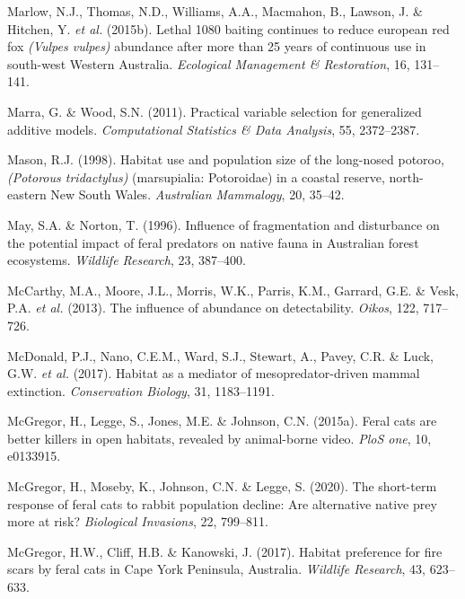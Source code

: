 \documentclass[11pt,a4paper,titlepage,twoside,openright]{style/unimelbthesis}
\begin{document}
\begin{mainmatter}
\leavevmode\hypertarget{ref-marlow2015lethal}{}%
Marlow, N.J., Thomas, N.D., Williams, A.A., Macmahon, B., Lawson, J. \& Hitchen, Y. \emph{et al.} (2015b). Lethal 1080 baiting continues to reduce european red fox \emph{(Vulpes vulpes)} abundance after more than 25 years of continuous use in south-west Western Australia. \emph{Ecological Management \& Restoration}, 16, 131--141.

\leavevmode\hypertarget{ref-marra2011practical}{}%
Marra, G. \& Wood, S.N. (2011). Practical variable selection for generalized additive models. \emph{Computational Statistics \& Data Analysis}, 55, 2372--2387.

\leavevmode\hypertarget{ref-mason1998habitat}{}%
Mason, R.J. (1998). Habitat use and population size of the long-nosed potoroo, \emph{(Potorous tridactylus)} (marsupialia: Potoroidae) in a coastal reserve, north-eastern New South Wales. \emph{Australian Mammalogy}, 20, 35--42.

\leavevmode\hypertarget{ref-may1996influence}{}%
May, S.A. \& Norton, T. (1996). Influence of fragmentation and disturbance on the potential impact of feral predators on native fauna in Australian forest ecosystems. \emph{Wildlife Research}, 23, 387--400.

\leavevmode\hypertarget{ref-mccarthy2013influence}{}%
McCarthy, M.A., Moore, J.L., Morris, W.K., Parris, K.M., Garrard, G.E. \& Vesk, P.A. \emph{et al.} (2013). The influence of abundance on detectability. \emph{Oikos}, 122, 717--726.

\leavevmode\hypertarget{ref-mcdonald2017habitat}{}%
McDonald, P.J., Nano, C.E.M., Ward, S.J., Stewart, A., Pavey, C.R. \& Luck, G.W. \emph{et al.} (2017). Habitat as a mediator of mesopredator-driven mammal extinction. \emph{Conservation Biology}, 31, 1183--1191.

\leavevmode\hypertarget{ref-mcgregor2015feral}{}%
McGregor, H., Legge, S., Jones, M.E. \& Johnson, C.N. (2015a). Feral cats are better killers in open habitats, revealed by animal-borne video. \emph{PloS one}, 10, e0133915.

\leavevmode\hypertarget{ref-mcgregor2020short}{}%
McGregor, H., Moseby, K., Johnson, C.N. \& Legge, S. (2020). The short-term response of feral cats to rabbit population decline: Are alternative native prey more at risk? \emph{Biological Invasions}, 22, 799--811.

\leavevmode\hypertarget{ref-mcgregor2017habitat}{}%
McGregor, H.W., Cliff, H.B. \& Kanowski, J. (2017). Habitat preference for fire scars by feral cats in Cape York Peninsula, Australia. \emph{Wildlife Research}, 43, 623--633.


\end{mainmatter}
\end{document}
